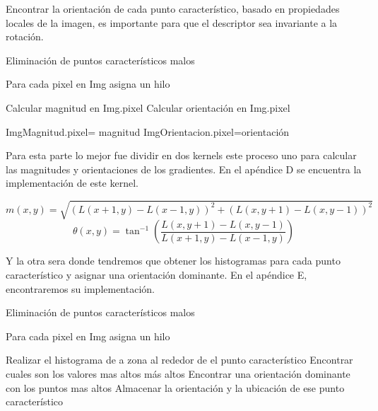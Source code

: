 Encontrar la orientación de cada punto característico, basado en propiedades locales de la imagen, es importante para que el descriptor sea invariante a la rotación.


\begin{algorithm}[H]
\caption{Eliminación de puntos característicos malos}
 Para cada pixel en Img asigna un hilo\;
 
 {
	Calcular magnitud en Img.pixel\;
	Calcular orientación en Img.pixel\;
	
	ImgMagnitud.pixel= magnitud\;
	ImgOrientacion.pixel=orientación\;
	
}
\end{algorithm}



Para esta parte lo mejor fue dividir en dos kernels este proceso uno para calcular las magnitudes y orientaciones de los gradientes. En el apéndice D se encuentra la implementación de este kernel.

$$m(x,y) = \sqrt{ (L(x+1,y)-L(x-1,y))^2 + (L(x,y+1)-L(x,y-1))^2 }$$		
$$\theta(x,y) =  \tan^{-1} \left(\frac{L(x,y+1)-L(x,y-1)}{L(x+1,y)-L(x-1,y)}\right)$$

Y la otra sera donde tendremos que obtener los histogramas para cada punto característico y asignar una orientación dominante. En el apéndice E, encontraremos su implementación. 


\begin{algorithm}[H]
\caption{Eliminación de puntos característicos malos}
 Para cada pixel en Img asigna un hilo\;
 
 {
	{
		Realizar el histograma de a zona al rededor de el punto característico\;
		Encontrar cuales son los valores mas altos más altos\;
		Encontrar una orientación dominante con los puntos mas altos\;
		Almacenar la orientación y la ubicación de ese punto característico\; 
				
	}
	
	
		
}
	
\end{algorithm}
































